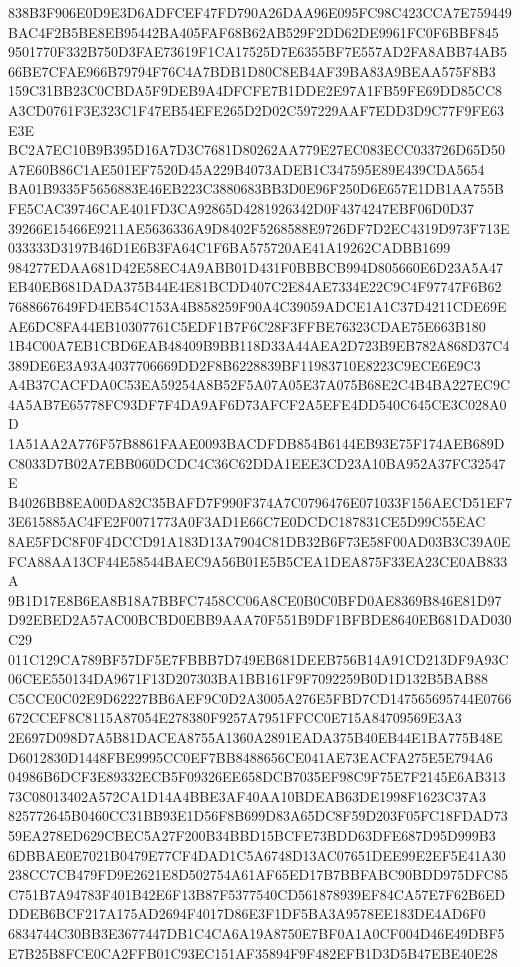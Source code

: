 \documentclass[UTF8,fontset=fandol,zihao=-4,a4paper]{ctexart}
\begin{document}
{{838B3F906E0D9E3D6ADFCEF47FD790A26DAA96E095FC98C423CCA7E759449BAC4F2B5BE8EB95442BA405FAF68B62AB529F2DD62DE9961FC0F6BBF845
9501770F332B750D3FAE73619F1CA17525D7E6355BF7E557AD2FA8ABB74AB566BE7CFAE966B79794F76C4A7BDB1D80C8EB4AF39BA83A9BEAA575F8B3
159C31BB23C0CBDA5F9DEB9A4DFCFE7B1DDE2E97A1FB59FE69DD85CC8A3CD0761F3E323C1F47EB54EFE265D2D02C597229AAF7EDD3D9C77F9FE63E3E
BC2A7EC10B9B395D16A7D3C7681D80262AA779E27EC083ECC033726D65D50A7E60B86C1AE501EF7520D45A229B4073ADEB1C347595E89E439CDA5654
BA01B9335F5656883E46EB223C3880683BB3D0E96F250D6E657E1DB1AA755BFE5CAC39746CAE401FD3CA92865D4281926342D0F4374247EBF06D0D37
39266E15466E9211AE5636336A9D8402F5268588E9726DF7D2EC4319D973F713E033333D3197B46D1E6B3FA64C1F6BA575720AE41A19262CADBB1699
984277EDAA681D42E58EC4A9ABB01D431F0BBBCB994D805660E6D23A5A47EB40EB681DADA375B44E4E81BCDD407C2E84AE7334E22C9C4F97747F6B62
7688667649FD4EB54C153A4B858259F90A4C39059ADCE1A1C37D4211CDE69EAE6DC8FA44EB10307761C5EDF1B7F6C28F3FFBE76323CDAE75E663B180
1B4C00A7EB1CBD6EAB48409B9BB118D33A44AEA2D723B9EB782A868D37C4389DE6E3A93A4037706669DD2F8B6228839BF11983710E8223C9ECE6E9C3
A4B37CACFDA0C53EA59254A8B52F5A07A05E37A075B68E2C4B4BA227EC9C4A5AB7E65778FC93DF7F4DA9AF6D73AFCF2A5EFE4DD540C645CE3C028A0D
1A51AA2A776F57B8861FAAE0093BACDFDB854B6144EB93E75F174AEB689DC8033D7B02A7EBB060DCDC4C36C62DDA1EEE3CD23A10BA952A37FC32547E
B4026BB8EA00DA82C35BAFD7F990F374A7C0796476E071033F156AECD51EF73E615885AC4FE2F0071773A0F3AD1E66C7E0DCDC187831CE5D99C55EAC
8AE5FDC8F0F4DCCD91A183D13A7904C81DB32B6F73E58F00AD03B3C39A0EFCA88AA13CF44E58544BAEC9A56B01E5B5CEA1DEA875F33EA23CE0AB833A
9B1D17E8B6EA8B18A7BBFC7458CC06A8CE0B0C0BFD0AE8369B846E81D97D92EBED2A57AC00BCBD0EBB9AAA70F551B9DF1BFBDE8640EB681DAD030C29
011C129CA789BF57DF5E7FBBB7D749EB681DEEB756B14A91CD213DF9A93C06CEE550134DA9671F13D207303BA1BB161F9F7092259B0D1D132B5BAB88
C5CCE0C02E9D62227BB6AEF9C0D2A3005A276E5FBD7CD147565695744E0766672CCEF8C8115A87054E278380F9257A7951FFCC0E715A84709569E3A3
2E697D098D7A5B81DACEA8755A1360A2891EADA375B40EB44E1BA775B48ED6012830D1448FBE9995CC0EF7BB8488656CE041AE73EACFA275E5E794A6
04986B6DCF3E89332ECB5F09326EE658DCB7035EF98C9F75E7F2145E6AB31373C08013402A572CA1D14A4BBE3AF40AA10BDEAB63DE1998F1623C37A3
825772645B0460CC31BB93E1D56F8B699D83A65DC8F59D203F05FC18FDAD7359EA278ED629CBEC5A27F200B34BBD15BCFE73BDD63DFE687D95D999B3
6DBBAE0E7021B0479E77CF4DAD1C5A6748D13AC07651DEE99E2EF5E41A30238CC7CB479FD9E2621E8D502754A61AF65ED17B7BBFABC90BDD975DFC85
C751B7A94783F401B42E6F13B87F5377540CD561878939EF84CA57E7F62B6EDDDEB6BCF217A175AD2694F4017D86E3F1DF5BA3A9578EE183DE4AD6F0
6834744C30BB3E3677447DB1C4CA6A19A8750E7BF0A1A0CF004D46E49DBF5E7B25B8FCE0CA2FFB01C93EC151AF35894F9F482EFB1D3D5B47EBE40E28
}}
\end{document}
